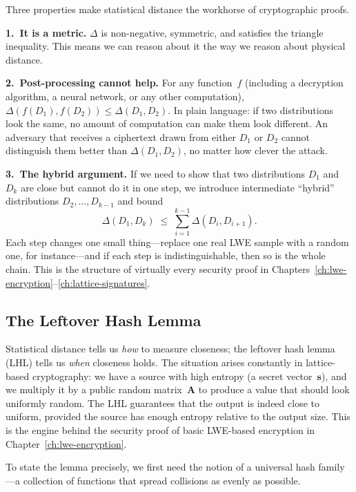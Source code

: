 Three properties make statistical distance the workhorse of cryptographic proofs.

\textbf{1.\ It is a metric.}  $\Delta$ is non-negative, symmetric, and satisfies the triangle inequality.  This means we can reason about it the way we reason about physical distance.

\textbf{2.\ Post-processing cannot help.}  For any function~$f$ (including a decryption algorithm, a neural network, or any other computation), $\Delta(f(D_1), f(D_2)) \leq \Delta(D_1, D_2)$.  In plain language: if two distributions look the same, no amount of computation can make them look different.  An adversary that receives a ciphertext drawn from either $D_1$ or $D_2$ cannot distinguish them better than $\Delta(D_1, D_2)$, no matter how clever the attack.

\textbf{3.\ The hybrid argument.}  If we need to show that two distributions $D_1$ and $D_k$ are close but cannot do it in one step, we introduce intermediate ``hybrid'' distributions $D_2, \ldots, D_{k-1}$ and bound
\[
\Delta(D_1, D_k) \;\leq\; \sum_{i=1}^{k-1}\Delta(D_i, D_{i+1}).
\]
Each step changes one small thing---replace one real LWE sample with a random one, for instance---and if each step is indistinguishable, then so is the whole chain.  This is the structure of virtually every security proof in Chapters~\ref{ch:lwe-encryption}--\ref{ch:lattice-signatures}.


\subsection{The Leftover Hash Lemma}
\label{subsec:lhl}

Statistical distance tells us \emph{how} to measure closeness; the leftover hash lemma (LHL) tells us \emph{when} closeness holds.  The situation arises constantly in lattice-based cryptography: we have a source with high entropy (a secret vector~$\mathbf{s}$), and we multiply it by a public random matrix~$\mathbf{A}$ to produce a value that should look uniformly random.  The LHL guarantees that the output is indeed close to uniform, provided the source has enough entropy relative to the output size.  This is the engine behind the security proof of basic LWE-based encryption in Chapter~\ref{ch:lwe-encryption}.

To state the lemma precisely, we first need the notion of a universal hash family---a collection of functions that spread collisions as evenly as possible.

